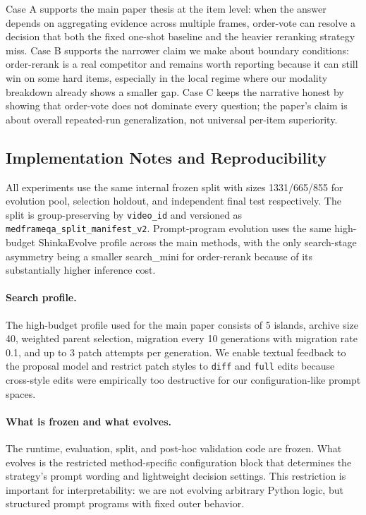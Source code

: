 \documentclass[11pt]{article}
\begin{document}
Case A supports the main paper thesis at the item level: when the answer depends on aggregating evidence across multiple frames, order-vote can resolve a decision that both the fixed one-shot baseline and the heavier reranking strategy miss. Case B supports the narrower claim we make about boundary conditions: order-rerank is a real competitor and remains worth reporting because it can still win on some hard items, especially in the local regime where our modality breakdown already shows a smaller gap. Case C keeps the narrative honest by showing that order-vote does not dominate every question; the paper's claim is about overall repeated-run generalization, not universal per-item superiority.

\subsection{Implementation Notes and Reproducibility}

All experiments use the same internal frozen split with sizes 1331/665/855 for evolution pool, selection holdout, and independent final test respectively. The split is group-preserving by \texttt{video\_id} and versioned as \texttt{medframeqa\_split\_manifest\_v2}. Prompt-program evolution uses the same high-budget ShinkaEvolve profile across the main methods, with the only search-stage asymmetry being a smaller search\_mini for order-rerank because of its substantially higher inference cost.

\paragraph{Search profile.}
The high-budget profile used for the main paper consists of 5 islands, archive size 40, weighted parent selection, migration every 10 generations with migration rate 0.1, and up to 3 patch attempts per generation. We enable textual feedback to the proposal model and restrict patch styles to \texttt{diff} and \texttt{full} edits because cross-style edits were empirically too destructive for our configuration-like prompt spaces.

\paragraph{What is frozen and what evolves.}
The runtime, evaluation, split, and post-hoc validation code are frozen. What evolves is the restricted method-specific configuration block that determines the strategy's prompt wording and lightweight decision settings. This restriction is important for interpretability: we are not evolving arbitrary Python logic, but structured prompt programs with fixed outer behavior.
\end{document}
